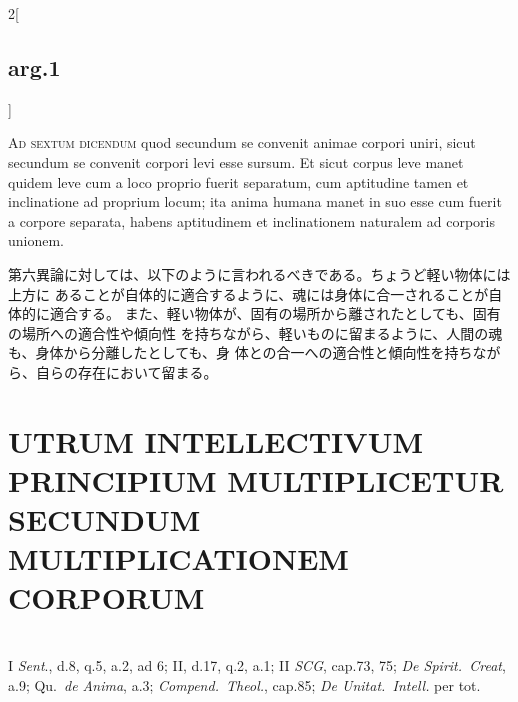 \documentclass[paper=a4paper,fontsize=10pt,jafontsize=9pt,titlepage]{jlreq}
\begin{document}
\begin{paracol}{2}[\subsection{arg.1}]
\switchcolumn*[\subsection{ad 6}]

 {\scshape Ad sextum dicendum} quod secundum se convenit animae corpori uniri,
 sicut secundum se convenit corpori levi esse sursum. Et sicut corpus leve manet
 quidem leve cum a loco proprio fuerit separatum, cum aptitudine tamen et
 inclinatione ad proprium locum; ita anima humana manet in suo esse cum fuerit a
 corpore separata, habens aptitudinem et inclinationem naturalem ad corporis
 unionem.
 
\switchcolumn

 第六異論に対しては、以下のように言われるべきである。ちょうど軽い物体には上方に
 あることが自体的に適合するように、魂には身体に合一されることが自体的に適合する。
 また、軽い物体が、固有の場所から離されたとしても、固有の場所への適合性や傾向性
 を持ちながら、軽いものに留まるように、人間の魂も、身体から分離したとしても、身
 体との合一への適合性と傾向性を持ちながら、自らの存在において留まる。

  \end{paracol}
\newpage


\section{UTRUM INTELLECTIVUM PRINCIPIUM MULTIPLICETUR SECUNDUM MULTIPLICATIONEM CORPORUM}
\vspace{1em}
\\
\vspace{1em}
{\footnotesize I {\itshape Sent}., d.8, q.5, a.2, ad 6; II, d.17, q.2, a.1; II {\itshape SCG}, cap.73, 75; {\itshape De Spirit.~Creat}, a.9; Qu.~{\itshape de Anima}, a.3; {\itshape Compend.~Theol.}, cap.85; {\itshape De Unitat.~Intell.} per tot.}
\end{document}
